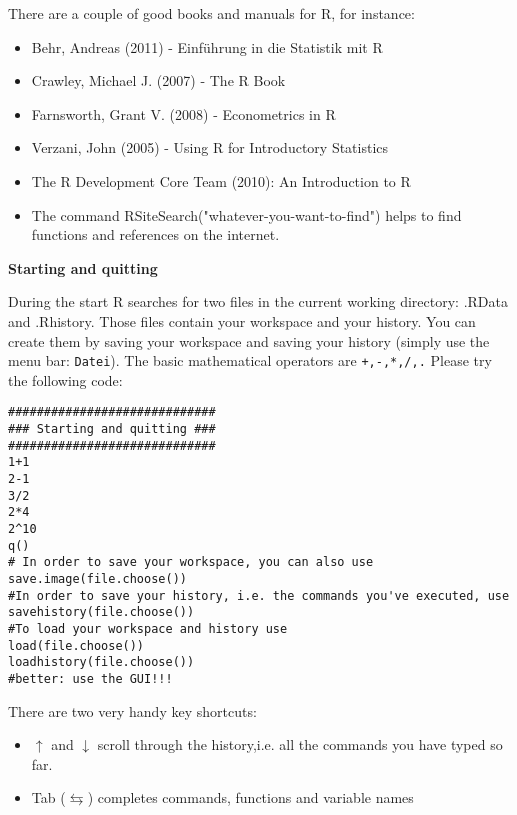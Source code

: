 \begin{Solution}{1}
There are a couple of good books and manuals for R, for instance:
\begin{itemize}
    \item Behr, Andreas (2011) - Einf\"{u}hrung in die Statistik mit R
    \item Crawley, Michael J. (2007) - The R Book
    \item Farnsworth, Grant V. (2008) - Econometrics in R
    \item Verzani, John (2005) - Using R for Introductory Statistics
    \item The R Development Core Team (2010): An Introduction to R
    \item The command RSiteSearch("whatever-you-want-to-find") helps to find functions and references on the internet.
\end{itemize}
\end{Solution}
\begin{Solution}{1.1}
\textbf{Starting and quitting}

During the start R searches for two files in the current working directory: .RData and .Rhistory. Those files contain your workspace and your history. You can create them by saving your workspace and saving your history (simply use the menu bar: \texttt{Datei}). The basic mathematical operators are \texttt{+,-,*,/,.} Please try the following code:

\begin{verbatim}
#############################
### Starting and quitting ###
#############################
1+1
2-1
3/2
2*4
2^10
q()
# In order to save your workspace, you can also use
save.image(file.choose())
#In order to save your history, i.e. the commands you've executed, use
savehistory(file.choose())
#To load your workspace and history use
load(file.choose())
loadhistory(file.choose())
#better: use the GUI!!!
\end{verbatim}

There are two very handy key shortcuts:
\begin{itemize}
    \item $\uparrow $ and $\downarrow $ scroll through the history,i.e.
        all the commands you have typed so far.
    \item Tab ($\leftrightarrows $) completes commands, functions and
        variable names
\end{itemize}
\end{Solution}

